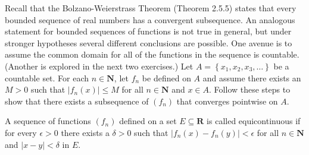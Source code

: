\begin{exercise}
  Recall that the Bolzano-Weierstrass Theorem (Theorem 2.5.5) states that every bounded sequence of real numbers has a convergent subsequence. An analogous statement for bounded sequences of functions is not true in general, but under stronger hypotheses several different conclusions are possible. One avenue is to assume the common domain for all of the functions in the sequence is countable. (Another is explored in the next two exercises.)
  Let $A=\left\{x_{1}, x_{2}, x_{3}, \ldots\right\}$ be a countable set. For each $n \in \mathbf{N}$, let $f_{n}$ be defined on $A$ and assume there exists an $M>0$ such that $\left|f_{n}(x)\right| \leq M$ for all $n \in \mathbf{N}$ and $x \in A$. Follow these steps to show that there exists a subsequence of $\left(f_{n}\right)$ that converges pointwise on $A$.

\end{exercise}
\begin{solution}
  \TODO
\end{solution}
\begin{exercise}
  A sequence of functions $\left(f_{n}\right)$ defined on a set $E \subseteq \mathbf{R}$ is called equicontinuous if for every $\epsilon>0$ there exists a $\delta>0$ such that $\left|f_{n}(x)-f_{n}(y)\right|<\epsilon$ for all $n \in \mathbf{N}$ and $|x-y|<\delta$ in $E$.
\end{exercise}
